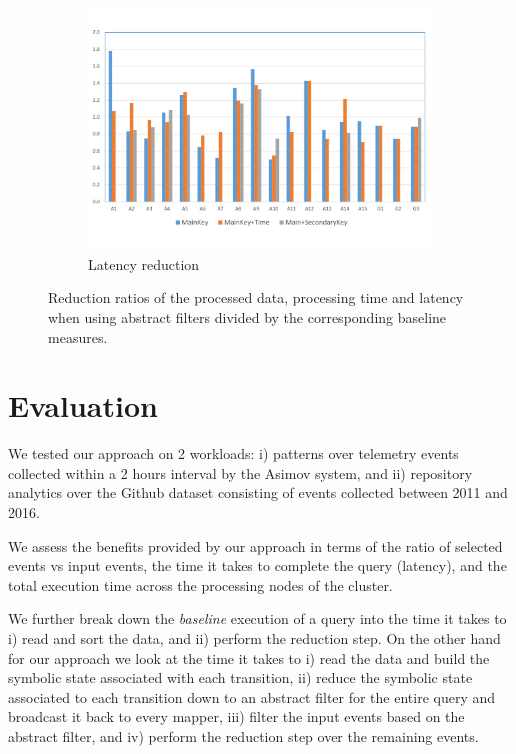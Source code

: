 \begin{figure}[t]
\begin{subfigure}[t]{\columnwidth}
\includegraphics[clip, trim=0.8cm 1.5cm 0.9cm 1cm,
width=\columnwidth]{graphs/latency_red.pdf}
\caption{Latency reduction}
\label{fig:latency_red}
\end{subfigure}

\caption{Reduction ratios of the processed data, processing time and latency
when using abstract filters divided by the corresponding baseline measures.}
\end{figure}





\section{Evaluation}

We tested our approach on 2 workloads:
i) patterns over telemetry events collected within a 2 hours interval by the
Asimov system, and 
ii) repository analytics over the Github dataset consisting of events collected
between 2011 and 2016.



We assess the benefits provided by our approach in terms of the ratio of
selected events vs input events, the time it takes to complete the query
(latency), and the total execution time across the processing nodes of the
cluster.


We further break down the {\em baseline} execution of a query into the time it
takes to 
i) read and sort the data, and 
ii) perform the reduction step.
On the other hand for our approach we look at the time it takes to 
i) read the data and build the symbolic state associated with each transition,
ii) reduce the symbolic state associated to each transition down to an abstract
filter for the entire query and broadcast it back to every mapper,
iii) filter the input events based on the abstract filter, and
iv) perform the reduction step over the remaining events. 


